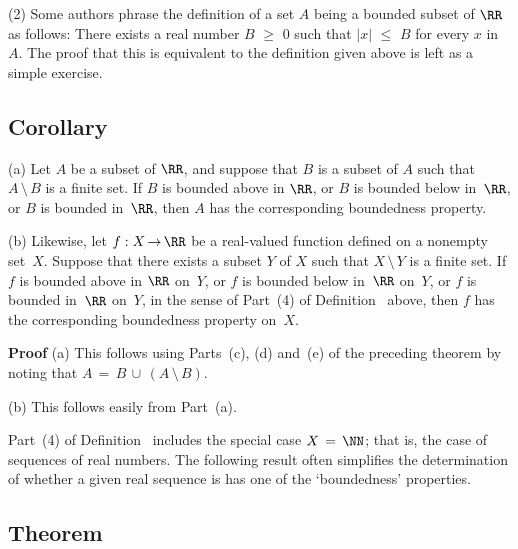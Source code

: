 \V

        (2) Some authors phrase the definition of a set $A$ being a bounded subset of ${\RR}$ as follows: There exists a real number $B\,\,{\geq}\,\,0$ such that $|x|\,\,{\leq}\,\,B$ for every $x$ in~$A$.
    The proof that this is equivalent to the definition given above is left as a simple exercise. %


\VV


            \subsection{\small{\bf Corollary}}
            \label{CorB20.195C}

\V

\hspace*{\parindent} (a) Let $A$ be a subset of ${\RR}$, and suppose that
    $B$ is a subset of $A$ such that $A\,{\setminus}\,B$ is a finite set. If $B$ is bounded above in ${\RR}$, or $B$ is bounded below in~${\RR}$, or $B$ is bounded in~${\RR}$,
    then $A$ has the corresponding boundedness property.

        (b) Likewise, let $f:X \,{\rightarrow}\, {\RR}$ be a real-valued function defined on a nonempty set~$X$.
    Suppose that there exists a subset $Y$ of $X$ such that $X\,{\setminus}\,Y$ is a finite set.
    If $f$ is bounded above in ${\RR}$ on~$Y$, or $f$ is bounded below in~${\RR}$ on~$Y$, or $f$ is bounded in~${\RR}$ on~$Y$,
    in the sense of Part~(4) of Definition~ above, then $f$ has the corresponding boundedness property on~$X$.

\V

        {\bf Proof} (a) This follows using Parts~(c), (d) and~(e) of the preceding theorem 
by noting that $A \,=\, B\,{\cup}\,(A\,{\setminus}\,B)$.

\V

        (b) This follows easily from Part~(a).


\VV



        Part~(4) of Definition~ includes the special case $X \,=\, {\NN}$; that is, the case of sequences of real numbers.
     The following result
    often simplifies the determination of whether a given real sequence is has one of the `boundedness' properties.

\V

            \subsection{\small{\bf Theorem}}
            \label{ThmB30.15}


